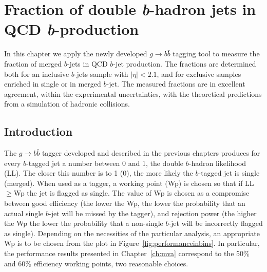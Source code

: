 %
\chapter{Fraction of double {\em b\hspace{.5mm}}-hadron jets in QCD {\em b\hspace{.5mm}}-production}\label{ch:gbbfraction}


In this chapter we apply the newly developed $g \rightarrow b\bar{b}$ tagging tool to measure the fraction of merged $b$-jets in QCD $b$-jet production. The fractions are determined both for an inclusive $b$-jets sample with $|\eta|<2.1$, and for exclusive samples enriched in single or in merged $b$-jet.
The measured fractions are in excellent agreement, within the experimental uncertainties, with the theoretical predictions from a simulation of hadronic collisions.


\section{Introduction}\label{sec:FitIntro}

The $g\rightarrow b\bar{b}$ tagger developed and described in the previous chapters produces for every $b$-tagged jet a number between 0 and 1, the double $b$-hadron likelihood (LL). The closer this number is to 1 (0), the more likely the $b$-tagged jet is single (merged). When used as a tagger, a working point (Wp) is chosen so that if LL$\geq$Wp the jet is flagged as single. The value of Wp is chosen as a compromise between good efficiency (the lower the Wp, the lower the probability that an actual single $b$-jet will be missed by the tagger), and rejection power (the higher the Wp the lower the probability that a non-single $b$-jet will be incorrectly flagged as single). Depending on the necessities of the particular analysis, an appropriate Wp is to be chosen from the plot in Figure~\ref{fig:performanceinbins}. In particular, the performance results presented in Chapter~\ref{ch:mva} correspond to the 50\% and 60\% efficiency working points, two reasonable choices.

